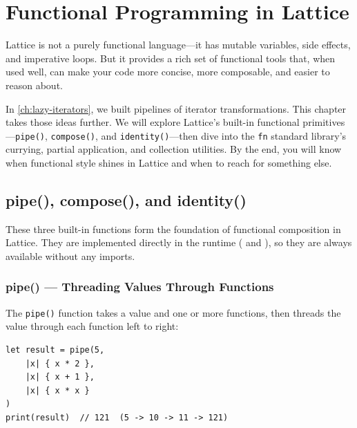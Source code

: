 \chapter{Functional Programming in Lattice}\label{ch:functional-programming}


Lattice is not a purely functional language---it has mutable variables, side effects, and imperative loops.
But it provides a rich set of functional tools that, when used well, can make your code more concise, more composable, and easier to reason about.

In \cref{ch:lazy-iterators}, we built pipelines of iterator transformations.
This chapter takes those ideas further.
We will explore Lattice's built-in functional primitives---\lstinline|pipe()|, \lstinline|compose()|, and \lstinline|identity()|---then dive into the \lstinline|fn| standard library's currying, partial application, and collection utilities.
By the end, you will know when functional style shines in Lattice and when to reach for something else.

\section{pipe(), compose(), and identity()}\label{sec:pipe-compose-identity}

These three built-in functions form the foundation of functional composition in Lattice.
They are implemented directly in the runtime ( and ), so they are always available without any imports.

\subsection{pipe() --- Threading Values Through Functions}\label{subsec:pipe}

The \lstinline|pipe()| function takes a value and one or more functions, then threads the value through each function left to right:

\begin{lstlisting}[language=Lattice, caption={Basic pipe usage}]
let result = pipe(5,
    |x| { x * 2 },
    |x| { x + 1 },
    |x| { x * x }
)
print(result)  // 121  (5 -> 10 -> 11 -> 121)
\end{lstlisting}

